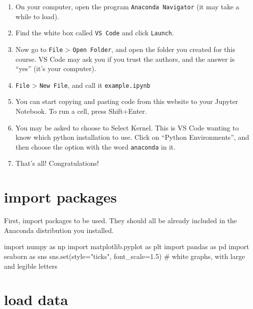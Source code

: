 \documentclass[
  letterpaper,
  DIV=11,
  numbers=noendperiod,
  oneside]{scrreprt}
\newenvironment{Shaded}{\begin{snugshade}}{\end{snugshade}}
\newcommand{\BuiltInTok}[1]{\textcolor[rgb]{0.00,0.23,0.31}{#1}}
\newcommand{\CommentTok}[1]{\textcolor[rgb]{0.37,0.37,0.37}{#1}}
\newcommand{\FloatTok}[1]{\textcolor[rgb]{0.68,0.00,0.00}{#1}}
\newcommand{\ImportTok}[1]{\textcolor[rgb]{0.00,0.46,0.62}{#1}}
\newcommand{\NormalTok}[1]{\textcolor[rgb]{0.00,0.23,0.31}{#1}}
\newcommand{\OperatorTok}[1]{\textcolor[rgb]{0.37,0.37,0.37}{#1}}
\newcommand{\StringTok}[1]{\textcolor[rgb]{0.13,0.47,0.30}{#1}}
\providecommand{\tightlist}{%
  \setlength{\itemsep}{0pt}\setlength{\parskip}{0pt}}\usepackage{longtable,booktabs,array}
\begin{document}
\begin{enumerate}
\def\labelenumi{\arabic{enumi}.}
\tightlist
\item
  On your computer, open the program \texttt{Anaconda\ Navigator} (it
  may take a while to load).
\item
  Find the white box called \texttt{VS\ Code} and click \texttt{Launch}.
\item
  Now go to \texttt{File} \textgreater{} \texttt{Open\ Folder}, and open
  the folder you created for this course. VS Code may ask you if you
  trust the authors, and the answer is ``yes'' (it's your computer).
\item
  \texttt{File} \textgreater{} \texttt{New\ File}, and call it
  \texttt{example.ipynb}
\item
  You can start copying and pasting code from this website to your
  Jupyter Notebook. To run a cell, press Shift+Enter.
\item
  You may be asked to choose to Select Kernel. This is VS Code wanting
  to know which python installation to use. Click on ``Python
  Environments'', and then choose the option with the word
  \texttt{anaconda} in it.
\item
  That's all! Congratulations!
\end{enumerate}

\hypertarget{import-packages}{%
\section{import packages}\label{import-packages}}

First, import packages to be used. They should all be already included
in the Anaconda distribution you installed.

\begin{Shaded}
\begin{Highlighting}[]
\ImportTok{import}\NormalTok{ numpy }\ImportTok{as}\NormalTok{ np}
\ImportTok{import}\NormalTok{ matplotlib.pyplot }\ImportTok{as}\NormalTok{ plt}
\ImportTok{import}\NormalTok{ pandas }\ImportTok{as}\NormalTok{ pd}
\ImportTok{import}\NormalTok{ seaborn }\ImportTok{as}\NormalTok{ sns}
\NormalTok{sns.}\BuiltInTok{set}\NormalTok{(style}\OperatorTok{=}\StringTok{"ticks"}\NormalTok{, font\_scale}\OperatorTok{=}\FloatTok{1.5}\NormalTok{)  }\CommentTok{\# white graphs, with large and legible letters}
\end{Highlighting}
\end{Shaded}

\hypertarget{load-data}{%
\section{load data}\label{load-data}}
\end{document}
